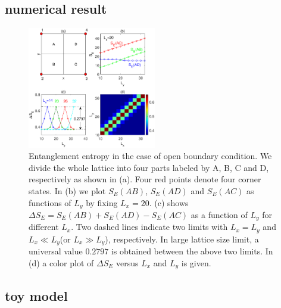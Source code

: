 \documentclass[aps,twocolumn,superscriptaddress]{revtex4-1}
\begin{document}
\subsection{numerical result}

\begin{figure}
    \includegraphics[width=0.5\textwidth]{fourpartite.eps}
    \caption{\label{fig:fourpartite} Entanglement entropy in the case of open boundary condition. 
    We divide the whole lattice into four parts labeled by A, B, C and D, 
    respectively as shown in (a). Four red points denote four corner states.
    In (b) we plot $S_E(AB)$, $S_E(AD)$ and $S_E(AC)$ as functions of $L_y$ by fixing $L_x=20$.
    (c) shows $\Delta S_E=S_E(AB)+S_E(AD)-S_E(AC)$ as a function of $L_y$ for different $L_x$.
    Two dashed lines indicate two limits with $L_x=L_y$ and $L_x\ll L_y$(or $L_x\gg L_y$), respectively. 
    In large lattice size limit, a universal value $0.2797$ is obtained between the above two limits.
    In (d) a color plot of $\Delta S_E$ versus $L_x$ and $L_y$ is given. }
\end{figure}

\subsection{toy model}
\end{document}
